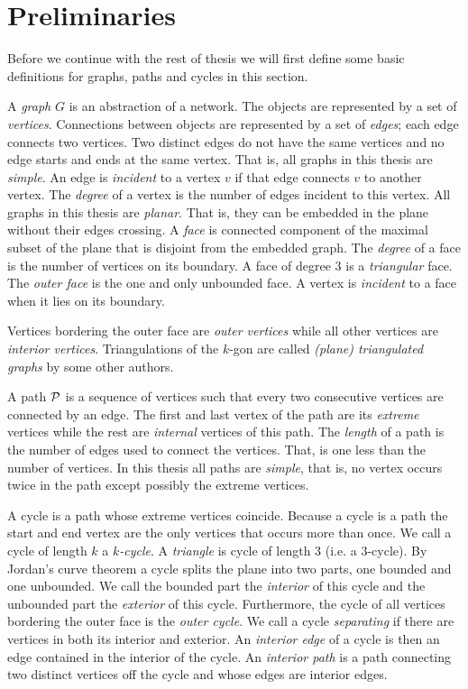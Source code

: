
\section{Preliminaries}
\thispagestyle{plain}
\label{s:prelim}

Before we continue with the rest of thesis we will first define some basic definitions for graphs, paths and cycles in this section.

  A \emph{graph} $G$ is an abstraction of a network. The objects are represented by a set of \emph{vertices}.
  Connections between objects are represented by a set of \emph{edges}; each edge connects two vertices.
  Two distinct edges do not have the same vertices and no edge starts and ends at the same vertex.
  That is, all graphs in this thesis are \emph{simple}.
  An edge is \emph{incident} to a vertex $v$ if that edge connects $v$ to another vertex.
  The \emph{degree} of a vertex is the number of edges incident to this vertex.
  All graphs in this thesis are \emph{planar}.
  That is, they can be embedded in the plane without their edges crossing. A \emph{face} is connected component of the maximal subset of the plane that is disjoint from the embedded graph. The \emph{degree} of a face is the number of vertices on its boundary.
  A face of degree $3$ is a \emph{triangular} face. The \emph{outer face} is the one and only unbounded face.
  A vertex is \emph{incident} to a face when it lies on its boundary.

  Vertices bordering the outer face are \emph{outer vertices} while all other vertices are \emph{interior vertices}.
  Triangulations of the $k$-gon are called \emph{(plane) triangulated graphs} by some other authors.


  A path $\P$ is a sequence of vertices such that every two consecutive vertices are connected by an edge. The first and last vertex of the path are its \emph{extreme} vertices while the rest are \emph{internal} vertices of this path. The \emph{length} of a path is the number of edges used to connect the vertices. That, is one less than the number of vertices. In this thesis all paths are \emph{simple}, that is, no vertex occurs twice in the path except possibly the extreme vertices.

  A cycle is a path whose extreme vertices coincide. Because a cycle is a path the start and end vertex are the only vertices that occurs more than once. We call a cycle of length $k$  a \emph{$k$-cycle}. A \emph{triangle} is cycle of length $3$ (i.e. a $3$-cycle). By Jordan's curve theorem a cycle splits the plane into two parts, one bounded and one unbounded. We call the bounded part the \emph{interior} of this cycle and the unbounded part the \emph{exterior} of this cycle.
  Furthermore, the cycle of all vertices bordering the outer face is the \emph{outer cycle}.
  We call a cycle \emph{separating} if there are vertices in both its interior and exterior.
  An \emph{interior edge} of a cycle is then an edge contained in the interior of the cycle.
  An \emph{interior path} is a path connecting two distinct vertices off the cycle and whose edges are interior edges.
